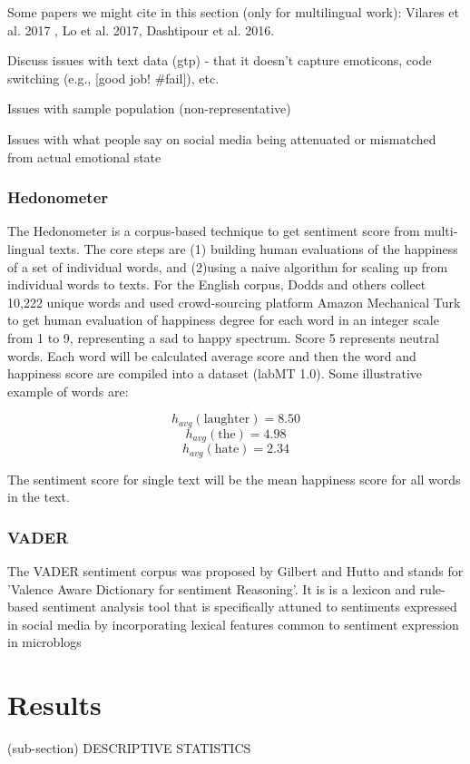 \documentclass{article}
\begin{document}
Some papers we might cite in this section (only for multilingual work): Vilares et al. 2017 , Lo et al. 2017, Dashtipour et al. 2016.

Discuss issues with text data (gtp) - that it doesn’t capture emoticons, code switching (e.g., [good job! #fail]), etc.

Issues with sample population (non-representative)

Issues with what people say on social media being attenuated or mismatched from actual emotional state

\subsubsection{Hedonometer}
The Hedonometer \cite{dodds_temporal_2011} is a corpus-based technique to get sentiment score from multi-lingual texts. The core steps are (1) building human evaluations of the happiness of a set of individual words, and (2)using a naive algorithm for scaling up from individual words to texts. For the English corpus, Dodds and others \cite{dodds_temporal_2011} collect 10,222 unique words and used crowd-sourcing platform Amazon Mechanical Turk to get human evaluation of happiness degree for each word in an integer scale from 1 to 9, representing a sad to happy spectrum. Score 5 represents neutral words. Each word will be calculated average score and then the word and happiness score are compiled into a dataset (labMT 1.0). Some illustrative example of words are: 

\[h_{avg} (\text{laughter}) = 8.50 \]
\[h_{avg} (\text{the}) = 4.98\]
\[h_{avg} (\text{hate}) = 2.34\]

The sentiment score for single text will be the mean happiness score for all words in the text.


\subsubsection{VADER}
The VADER sentiment corpus was proposed by Gilbert and Hutto \cite{gilbert_vader_2014} and stands for 'Valence Aware Dictionary for sentiment Reasoning'. It is is a lexicon and rule-based sentiment analysis tool that is specifically attuned to sentiments expressed in social media by incorporating lexical features common to sentiment expression in microblogs

\section{Results}
(sub-section) DESCRIPTIVE STATISTICS
\end{document}
